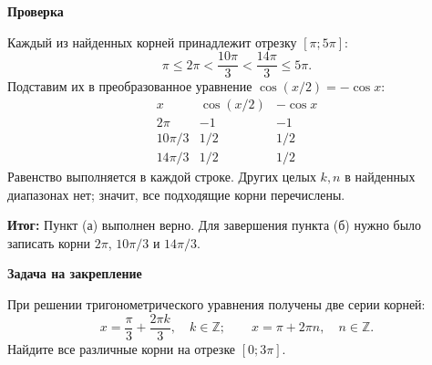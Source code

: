 \documentclass[11pt,a4paper]{article}
\newcommand{\conclusion}[1]{\par\textcolor{teal!60!black}{\textbf{Итог:}} #1\par}
\newcommand{\itemhead}[1]{\par\medskip\textbf{#1}\par}
\begin{document}
\itemhead{Проверка}
Каждый из найденных корней принадлежит отрезку $[\pi;5\pi]$:
\[
\pi\le2\pi<\frac{10\pi}{3}<\frac{14\pi}{3}\le5\pi.
\]
Подставим их в преобразованное уравнение
$\cos(x/2)=-\cos x$:
\[
\begin{array}{c|cc}
 x&\cos(x/2)&-\cos x\\\hline
 2\pi&-1&-1\\
 10\pi/3&1/2&1/2\\
 14\pi/3&1/2&1/2
\end{array}
\]
Равенство выполняется в каждой строке.
Других целых $k,n$ в найденных диапазонах нет;
значит, все подходящие корни перечислены.

\conclusion{Пункт (а) выполнен верно. Для завершения пункта (б)
нужно было записать корни $2\pi$, $10\pi/3$ и $14\pi/3$.}

\itemhead{Задача на закрепление}
При решении тригонометрического уравнения получены
две серии корней:
\[
 x=\frac{\pi}{3}+\frac{2\pi k}{3},\quad k\in\mathbb Z;
 \qquad x=\pi+2\pi n,\quad n\in\mathbb Z.
\]
Найдите все различные корни на отрезке $[0;3\pi]$.
\end{document}
